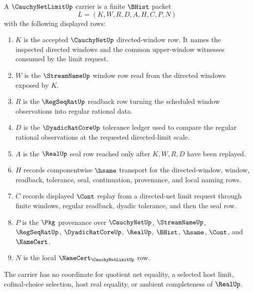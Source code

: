 \begin{definition}
\label{def:cauchy-net-limit-carrier}
A $\CauchyNetLimitUp$ carrier is a finite $\BHist$ packet
$$
L=(K,W,R,D,A,H,C,P,N)
$$
with the following displayed rows:
\begin{enumerate}
\item $K$ is the accepted $\CauchyNetUp$ directed-window row. It names the inspected directed windows and the common upper-window witnesses consumed by the limit request.
\item $W$ is the $\StreamNameUp$ window row read from the directed windows exposed by $K$.
\item $R$ is the $\RegSeqRatUp$ readback row turning the scheduled window observations into regular rational data.
\item $D$ is the $\DyadicRatCoreUp$ tolerance ledger used to compare the regular rational observations at the requested directed-limit scale.
\item $A$ is the $\RealUp$ seal row reached only after $K,W,R,D$ have been replayed.
\item $H$ records componentwise $\hsame$ transport for the directed-window, window, readback, tolerance, seal, continuation, provenance, and local naming rows.
\item $C$ records displayed $\Cont$ replay from a directed-net limit request through finite windows, regular readback, dyadic tolerance, and then the seal row.
\item $P$ is the $\Pkg$ provenance over $\CauchyNetUp$, $\StreamNameUp$, $\RegSeqRatUp$, $\DyadicRatCoreUp$, $\RealUp$, $\BHist$, $\hsame$, $\Cont$, and $\NameCert$.
\item $N$ is the local $\NameCert_{\CauchyNetLimitUp}$ row.
\end{enumerate}
The carrier has no coordinate for quotient net equality, a selected host limit, cofinal-choice selection, host real equality, or ambient completeness of $\RealUp$.
\end{definition}

